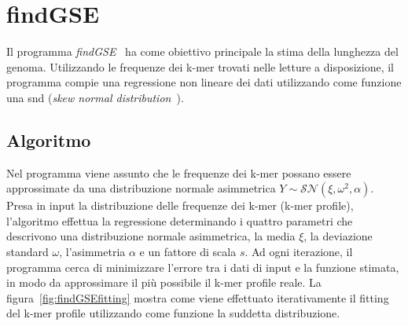 \documentclass[crop=false, class=book]{standalone}
\begin{document}
	\section{findGSE}
	
	Il programma \textit{findGSE}~\cite{sun2017findGSE} ha come obiettivo principale la stima della lunghezza del genoma. Utilizzando le frequenze dei k-mer trovati nelle letture a disposizione, il programma compie una regressione non lineare dei dati utilizzando come funzione una \gls{snd} (\textit{skew normal distribution}~\cite{azzalini1985class,azzalini2005skew}).
	
	
	\subsection{Algoritmo}
	Nel programma viene assunto che le frequenze dei k-mer possano essere approssimate da una distribuzione normale asimmetrica $Y \sim \mathcal{SN}(\xi, \omega^2, \alpha)$. Presa in input la distribuzione delle frequenze dei k-mer (k-mer profile), l'algoritmo effettua la regressione determinando i quattro parametri che descrivono una distribuzione normale asimmetrica, la media $\xi$, la deviazione standard $\omega$, l'asimmetria $\alpha$ e un fattore di scala $s$. Ad ogni iterazione, il programma cerca di minimizzare l'errore tra i dati di input e la funzione stimata, in modo da approssimare il più possibile il k-mer profile reale. La figura~\vref{fig:findGSEfitting} mostra come viene effettuato iterativamente il fitting del k-mer profile utilizzando come funzione la suddetta distribuzione.
	
\end{document}
